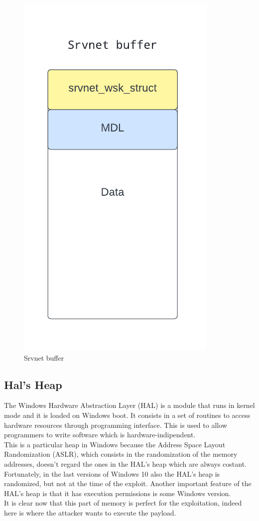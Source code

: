 \begin{figure}[ht!]
    \centering
      \includegraphics[scale=0.7]{images/srvnet_buffer.png}
      \caption{Srvnet buffer}
\end{figure}

\clearpage

\subsection{Hal's Heap}
The Windows Hardware Abstraction Layer (HAL)\cite{windows-hal} is a module that runs in kernel mode and it is loaded on Windows boot. It consists in a set of routines to access hardware resources
through programming interface. This is used to allow programmers to write software which is hardware-indipendent.\\
This is a particular heap in Windows because the Address Space Layout Randomization (ASLR), which consists in the randomization of the memory addresses,
doesn't regard the ones in the HAL's heap which are always costant.
Fortunately, in the last versions of Windows 10 also the HAL's heap is randomized, but not at the time of the exploit.
Another important feature of the HAL's heap is that it has execution permissions is some Windows version.\\
It is clear now that this part of memory is perfect for the exploitation, indeed here is where the attacker wants to execute the payload.

